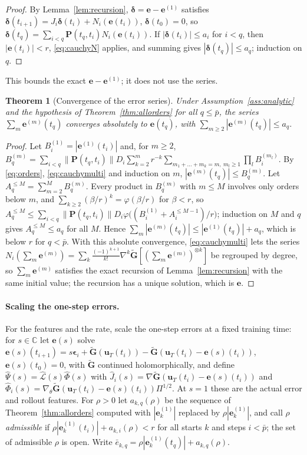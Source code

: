 \documentclass[11pt]{article}
\newtheorem{theorem}{Theorem}
\theoremstyle{definition}
\theoremstyle{remark}
\newcommand{\uu}{\mathbf{u}}
\newcommand{\ee}{\mathbf{e}}
\newcommand{\Gt}{\tilde{\mathbf{G}}}
\newcommand{\eps}{\bm{\epsilon}}
\newcommand{\Pp}{\mathbf P}
\newcommand{\LLh}{\hat{\mathcal{L}}}
\newcommand{\Phih}{\hat\Phi}
\newcommand{\Psih}{\hat\Psi}
\begin{document}
\begin{proof}
By Lemma~\ref{lem:recursion}, $\bm\delta=\ee-\ee^{(1)}$ satisfies $\bm\delta(t_{i+1})=J_i\bm\delta(t_i)+N_i(\ee(t_i))$, $\bm\delta(t_0)=0$, so $\bm\delta(t_q)=\sum_{i<q}\Pp(t_q,t_i)N_i(\ee(t_i))$.
If $|\bm\delta(t_i)|\le a_i$ for $i<q$, then $|\ee(t_i)|<r$, \eqref{eq:cauchyN} applies, and summing gives $|\bm\delta(t_q)|\le a_q$; induction on $q$.
\end{proof}

This bounds the exact $\ee-\ee^{(1)}$; it does not use the series.

\begin{theorem}[Convergence of the error series]\label{thm:convergence}
Under Assumption~\ref{ass:analytic} and the hypothesis of Theorem~\ref{thm:allorders} for all $q\le\bar p$, the series $\sum_m\ee^{(m)}(t_q)$ converges absolutely to $\ee(t_q)$, with $\sum_{m\ge2}|\ee^{(m)}(t_q)|\le a_q$.
\end{theorem}

\begin{proof}
Let $B^{(1)}_i=|\ee^{(1)}(t_i)|$ and, for $m\ge2$, $B^{(m)}_q=\sum_{i<q}\|\Pp(t_q,t_i)\|D_i\sum_{k=2}^mr^{-k}\sum_{m_1+\dots+m_k=m,\ m_l\ge1}\prod_lB^{(m_l)}_i$.
By \eqref{eq:orders}, \eqref{eq:cauchymulti} and induction on $m$, $|\ee^{(m)}(t_q)|\le B^{(m)}_q$.
Let $A^{\le M}_q=\sum_{m=2}^MB^{(m)}_q$. Every product in $B^{(m)}_q$ with $m\le M$ involves only orders below $m$, and $\sum_{k\ge2}(\beta/r)^k=\varphi(\beta/r)$ for $\beta<r$, so $A^{\le M}_q\le\sum_{i<q}\|\Pp(t_q,t_i)\|D_i\varphi\big((B^{(1)}_i+A^{\le M-1}_i)/r\big)$; induction on $M$ and $q$ gives $A^{\le M}_q\le a_q$ for all $M$.
Hence $\sum_m|\ee^{(m)}(t_q)|\le|\ee^{(1)}(t_q)|+a_q$, which is below $r$ for $q<\bar p$.
With this absolute convergence, \eqref{eq:cauchymulti} lets the series $N_i(\sum_m\ee^{(m)})=\sum_k\frac{(-1)^{k+1}}{k!}\nabla^k\Gt[(\sum_m\ee^{(m)})^{\otimes k}]$ be regrouped by degree, so $\sum_m\ee^{(m)}$ satisfies the exact recursion of Lemma~\ref{lem:recursion} with the same initial value; the recursion has a unique solution, which is $\ee$.
\end{proof}

\paragraph{Scaling the one-step errors.}
For the features and the rate, scale the one-step errors at a fixed training time: for $s\in\mathbb C$ let $\ee(s)$ solve $\ee(s)(t_{i+1})=s\eps_i+\Gt(\uu_T(t_i))-\Gt(\uu_T(t_i)-\ee(s)(t_i))$, $\ee(s)(t_0)=0$, with $\Gt$ continued holomorphically, and define $\Psih(s)=\LLh(s)\Phih(s)$ with $\hat J_i(s)=\nabla\Gt(\uu_T(t_i)-\ee(s)(t_i))$ and $\Phih_i(s)=\nabla_\theta\Gt(\uu_T(t_i)-\ee(s)(t_i))\Pi^{1/2}$.
At $s=1$ these are the actual error and rollout features.
For $\rho>0$ let $a_{k,q}(\rho)$ be the sequence of Theorem~\ref{thm:allorders} computed with $|\ee^{(1)}_k|$ replaced by $\rho|\ee^{(1)}_k|$, and call $\rho$ \emph{admissible} if $\rho|\ee^{(1)}_k(t_i)|+a_{k,i}(\rho)<r$ for all starts $k$ and steps $i<\bar p$; the set of admissible $\rho$ is open.
Write $\bar e_{k,q}=\rho|\ee^{(1)}_k(t_q)|+a_{k,q}(\rho)$.
\end{document}
